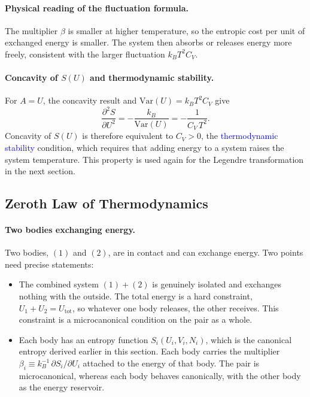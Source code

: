 \paragraph{Physical reading of the fluctuation formula.}
The multiplier $\beta$ is smaller at higher temperature, so the entropic
cost per unit of exchanged energy is smaller. The system then absorbs or
releases energy more freely, consistent with the larger fluctuation
$k_BT^2C_V$.

\paragraph{Concavity of $S(U)$ and thermodynamic stability.}
For $A=U$, the concavity result and $\mathrm{Var}(U)=k_BT^2C_V$ give
\begin{equation}
    \boxed{\frac{\partial^2 S}{\partial U^2}
    = -\frac{k_B}{\mathrm{Var}(U)} = -\frac{1}{C_V\,T^2}.}
\end{equation}
Concavity of $S(U)$ is therefore equivalent to $C_V>0$, the
\textcolor{blue}{thermodynamic stability} condition, which requires that
adding energy to a system raises the system temperature. This property is
used again for the Legendre transformation in the next section.

\subsection{Zeroth Law of Thermodynamics}

\paragraph{Two bodies exchanging energy.}
Two bodies, $(1)$ and $(2)$, are in contact and can exchange energy. Two
points need precise statements:
\begin{itemize}
    \item The combined system $(1)+(2)$ is genuinely isolated and exchanges
    nothing with the outside. The total energy is a hard constraint,
    $U_1+U_2=U_{\text{tot}}$, so whatever one body releases, the other
    receives. This constraint is a microcanonical condition on the pair as a
    whole.
    \item Each body has an entropy function $S_i(U_i,V_i,N_i)$, which is the
    canonical entropy derived earlier in this section. Each body carries the
    multiplier $\beta_i\equiv k_B^{-1}\,\partial S_i/\partial U_i$ attached to
    the energy of that body. The pair is microcanonical, whereas each body
    behaves canonically, with the other body as the energy reservoir.
\end{itemize}

